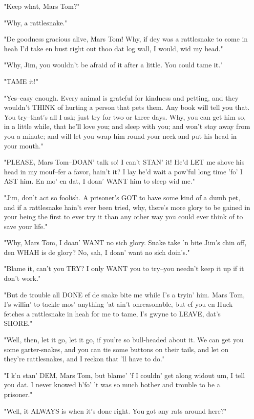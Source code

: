 "Keep what, Mars Tom?"

"Why, a rattlesnake."

"De goodness gracious alive, Mars Tom!  Why, if dey was a rattlesnake to
come in heah I'd take en bust right out thoo dat log wall, I would, wid
my head."

"Why, Jim, you wouldn't be afraid of it after a little.  You could tame
it."

"TAME it!"

"Yes--easy enough.  Every animal is grateful for kindness and petting,
and they wouldn't THINK of hurting a person that pets them.  Any book
will tell you that.  You try--that's all I ask; just try for two or three
days. Why, you can get him so, in a little while, that he'll love you; and
sleep with you; and won't stay away from you a minute; and will let you
wrap him round your neck and put his head in your mouth."

"PLEASE, Mars Tom--DOAN' talk so!  I can't STAN' it!  He'd LET me shove
his head in my mouf--fer a favor, hain't it?  I lay he'd wait a pow'ful
long time 'fo' I AST him.  En mo' en dat, I doan' WANT him to sleep wid
me."

"Jim, don't act so foolish.  A prisoner's GOT to have some kind of a dumb
pet, and if a rattlesnake hain't ever been tried, why, there's more glory
to be gained in your being the first to ever try it than any other way
you could ever think of to save your life."

"Why, Mars Tom, I doan' WANT no sich glory.  Snake take 'n bite Jim's
chin off, den WHAH is de glory?  No, sah, I doan' want no sich doin's."

"Blame it, can't you TRY?  I only WANT you to try--you needn't keep it up
if it don't work."

"But de trouble all DONE ef de snake bite me while I's a tryin' him.
Mars Tom, I's willin' to tackle mos' anything 'at ain't onreasonable, but
ef you en Huck fetches a rattlesnake in heah for me to tame, I's gwyne to
LEAVE, dat's SHORE."

"Well, then, let it go, let it go, if you're so bull-headed about it.  We
can get you some garter-snakes, and you can tie some buttons on their
tails, and let on they're rattlesnakes, and I reckon that 'll have to
do."

"I k'n stan' DEM, Mars Tom, but blame' 'f I couldn' get along widout um,
I tell you dat.  I never knowed b'fo' 't was so much bother and trouble
to be a prisoner."

"Well, it ALWAYS is when it's done right.  You got any rats around here?"

